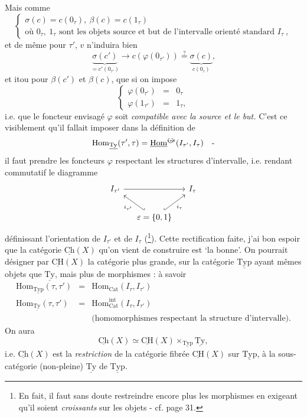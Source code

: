 \documentclass[11pt]{article}
\newcommand{\printedpage}[1]{\if\relax\detokenize{#1}\relax\else\marginpar{\raggedright\footnotesize p.~#1}\fi}
\newcommand{\msp}[1]{\marginpar{\raggedright\footnotesize [#1]}}
\newcommand{\circled}[1]{\text{\textcircled{$\scriptstyle #1$}}}
\newcommand{\ul}[1]{\underline{\mathrm{#1}}}
\begin{document}
\msp{page 29}
Mais comme
\[
\left\{
\begin{array}{l}
\sigma(c)=c(0_\tau),\ \beta(c)=c(1_\tau)\\[1ex]
\text{où } 0_\tau,\ 1_\tau \text{ sont les objets source et but de l'intervalle orienté standard } I_\tau\ ,
\end{array}
\right.
\]
et de même pour $\tau'$, $v$ n'induira bien
\[
\underbrace{\sigma(c')}_{=c'(0_{\tau'})} \longrightarrow c(\varphi(0_{\tau'})) \overset{?}{=} \underbrace{\sigma(c)}_{c(0_\tau)},
\]
et itou pour $\beta(c')$ et $\beta(c)$, que si on impose
\[
\boxed{
\left\{
\begin{array}{lcl}
\varphi(0_{\tau'}) & = & 0_\tau\\
\varphi(1_{\tau'}) & = & 1_\tau,
\end{array}
\right.
}
\]
i.e. que le foncteur envisagé $\varphi$ soit \textit{compatible avec la source et le but.} C'est ce visiblement qu'il fallait imposer dans la définition de %
\[
\mathrm{Hom}_{\ul{Ty}}(\tau',\tau)=\underline{\mathrm{Hom}}^{\circled{int}}(I_{\tau'},I_\tau)\quad\text{-}
\]
il faut prendre les foncteurs $\varphi$ respectant les structures d'intervalle, i.e. rendant commutatif le diagramme
\[
\begin{tikzcd}[column sep=small]
I_{\tau'} \arrow[rr] & & I_\tau \\
& \varepsilon=\{0,1\} \arrow[ul, hook', "i_{\tau'}"] \arrow[ur, hook, "i_\tau"'] &
\end{tikzcd}
\]
définissant l'orientation de $I_{\tau'}$ et de $I_\tau$ (\footnote[10]{En fait, il faut sans doute restreindre encore plus les morphismes en exigeant qu'il soient \textit{croissants} sur les objets - cf. page 31.}). Cette rectification faite, j'ai bon espoir que la catégorie $\ul{Ch}(X)$ qu'on vient de construire est `la bonne'. On pourrait désigner par $\ul{CH}(X)$ la catégorie plus grande, sur la catégorie $\ul{Typ}$ ayant mêmes objets que $\ul{Ty}$, mais plus de morphismes : à savoir %
\msp{page 30}
\[
\begin{array}{lcl}
\mathrm{Hom}_{\ul{Typ}}(\tau,\tau') & = & \mathrm{Hom}_{\mathrm{Cat}}(I_\tau,I_{\tau'})\\[0.5ex]
\mathrm{Hom}_{\ul{Ty}}(\tau,\tau') & = & \mathrm{Hom}^{\mathrm{int}}_{\mathrm{Cat}}(I_\tau,I_{\tau'})\\[0.5ex]
 & & \text{(homomorphismes respectant la structure d'intervalle).}
\end{array}
\]
On aura
\[
\ul{Ch}(X)\simeq\ul{CH}(X)\times_{\ul{Typ}}\ul{Ty},
\]
\printedpage{20}
i.e. $\ul{Ch}(X)$ est la \textit{restriction} de la catégorie fibrée $\ul{CH}(X)$ sur $\ul{Typ}$, à la sous-catégorie (non-pleine) $\ul{Ty}$ de $\ul{Typ}$.
\end{document}

